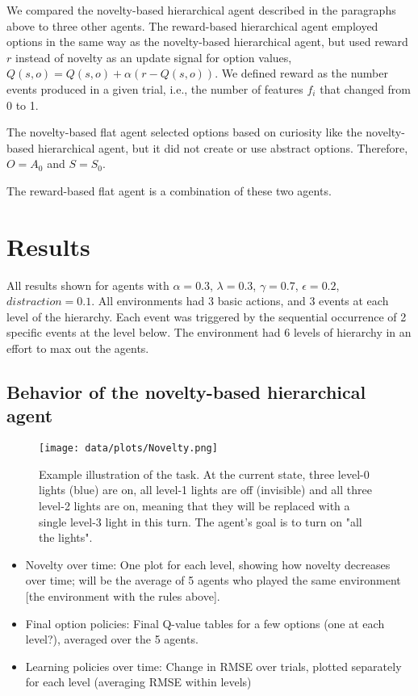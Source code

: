 \documentclass{article}
\begin{document}
We compared the novelty-based hierarchical agent described in the paragraphs above to three other agents. The reward-based hierarchical agent employed options in the same way as the novelty-based hierarchical agent, but used reward $r$ instead of novelty as an update signal for option values, $Q(s, o) = Q(s, o) + \alpha (r - Q(s, o))$. We defined reward as the number events produced in a given trial, i.e., the number of features $f_i$ that changed from 0 to 1. 

The novelty-based flat agent selected options based on curiosity like the novelty-based hierarchical agent, but it did not create or use abstract options. Therefore, $O = A_0$ and $S = S_0$. 

The reward-based flat agent is a combination of these two agents.

\section{Results}

All results shown for agents with $\alpha = 0.3$, $\lambda = 0.3$, $\gamma = 0.7$, $\epsilon = 0.2$, $distraction = 0.1$. All environments had 3 basic actions, and 3 events at each level of the hierarchy. Each event was triggered by the sequential occurrence of 2 specific events at the level below. The environment had 6 levels of hierarchy in an effort to max out the agents. 

\subsection{Behavior of the novelty-based hierarchical agent}

\begin{figure}[h]
	\centering
	\texttt{[image: data/plots/Novelty.png]}
	\caption{Example illustration of the task. At the current state, three level-0 lights (blue) are on, all level-1 lights are off (invisible) and all three level-2 lights are on, meaning that they will be replaced with a single level-3 light in this turn. The agent's goal is to turn on "all the lights".}
	\label{TaskFigure}
\end{figure}

\begin{itemize}
	\item Novelty over time: One plot for each level, showing how novelty decreases over time; will be the average of 5 agents who played the same environment [the environment with the rules above].
	\item Final option policies: Final Q-value tables for a few options (one at each level?), averaged over the 5 agents.
	\item Learning policies over time: Change in RMSE over trials, plotted separately for each level (averaging RMSE within levels)
\end{itemize}
\end{document}
